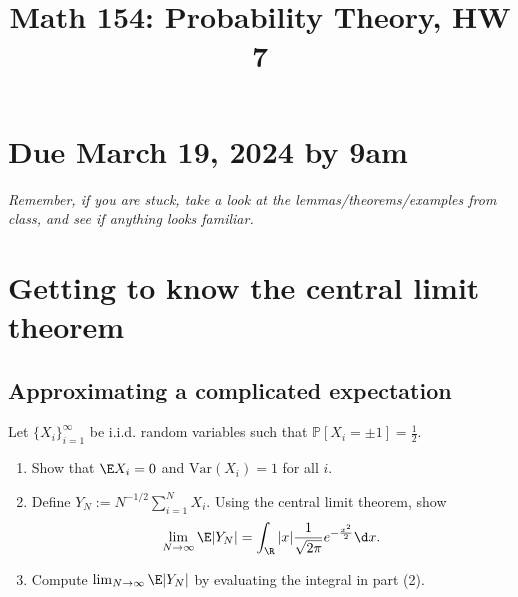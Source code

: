 \documentclass[12pt,reqno]{amsart}
\title{\Large Math 154: Probability Theory, HW 7\vspace{-0.1cm}}
\theoremstyle{definition}
\theoremstyle{remark}
\numberwithin{equation}{section}
\newenvironment{nouppercase}{%
  \let\uppercase\relax%
  \renewcommand{\uppercasenonmath}[1]{}}{}
\begin{document}
\begin{nouppercase}
\maketitle
\end{nouppercase}
\section*{Due March 19, 2024 by 9am}
\emph{Remember, if you are stuck, take a look at the lemmas/theorems/examples from class, and see if anything looks familiar.}
\section{Getting to know the central limit theorem}
\subsection{Approximating a complicated expectation}
Let $\{X_{i}\}_{i=1}^{\infty}$ be i.i.d. random variables such that $\mathbb{P}[X_{i}=\pm1]=\frac12$. 
\begin{enumerate}
\item Show that $\E X_{i}=0$ and $\mathrm{Var}(X_{i})=1$ for all $i$.
\item Define $Y_{N}:=N^{-1/2}\sum_{i=1}^{N}X_{i}$. Using the central limit theorem, show
%
\begin{align*}
\lim_{N\to\infty}\E|Y_{N}|=\int_{\R}|x|\frac{1}{\sqrt{2\pi}}e^{-\frac{x^{2}}{2}}\d x.
\end{align*}
%
\item Compute $\lim_{N\to\infty}\E|Y_{N}|$ by evaluating the integral in part (2).
\end{enumerate}
\end{document}
